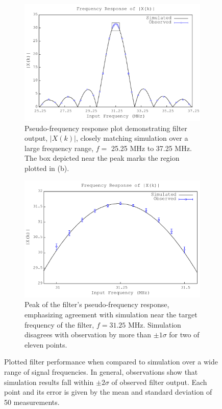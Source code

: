 \documentclass[reprint,amsmath,amssymb,aps,pra]{revtex4-2}
\begin{document}
\begin{figure}[t]
    \centering
    \begin{subfigure}[b]{0.49\textwidth}
        \includegraphics[width=\linewidth]{figs/freq_error.png}
        \caption{Pseudo-frequency response plot demonstrating filter output, $|X(k)|$, closely matching simulation over a large frequency range, $f = $ 25.25 MHz to 37.25 MHz. The box depicted near the peak marks the region plotted in (b).}
        \label{fig:plot1}
    \end{subfigure}
    \hfill
    \begin{subfigure}[b]{0.49\textwidth}
        \includegraphics[width=\linewidth]{figs/freq_error_zoom.png}
        \caption{Peak of the filter's pseudo-frequency response, emphasizing agreement with simulation near the target frequency of the filter, $f = 31.25$ MHz. Simulation disagrees with observation by more than $\pm1\sigma$ for two of eleven points.}
        \label{fig:plot2}
    \end{subfigure}
    \caption{Plotted filter performance when compared to simulation over a wide range of signal frequencies. In general, observations show that simulation results fall within $\pm2\sigma$ of observed filter output. Each point and its error is given by the mean and standard deviation of 50 measurements.}
    \label{fig:sidebyside}
\end{figure}
\end{document}
